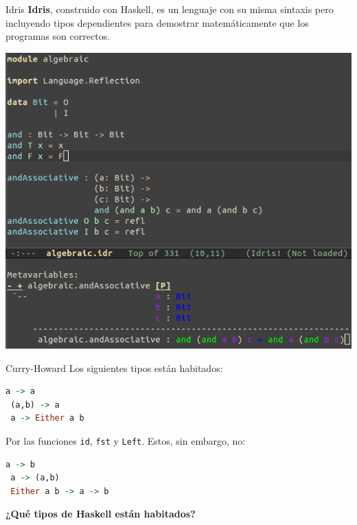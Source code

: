 \begin{frame}[fragile]{Idris}
  \textbf{Idris}, construido con Haskell, es un lenguaje
  con su misma sintaxis pero incluyendo tipos dependientes
  para demostrar matemáticamente que los programas son correctos.

  \begin{center}
  \includegraphics[scale=0.28]{./images/idris.png}
  \end{center}
\end{frame}


\begin{frame}[fragile]{Curry-Howard}
 Los siguientes tipos están habitados:
 \begin{lstlisting}[language=haskell]
 a -> a
 (a,b) -> a
 a -> Either a b
 \end{lstlisting}
 Por las funciones \texttt{id}, \texttt{fst} y \texttt{Left}.
 Estos, sin embargo, no:
 \begin{lstlisting}[language=haskell]
 a -> b
 a -> (a,b)
 Either a b -> a -> b
 \end{lstlisting}

 \textbf{¿Qué tipos de Haskell están habitados?}
 
\end{frame}


